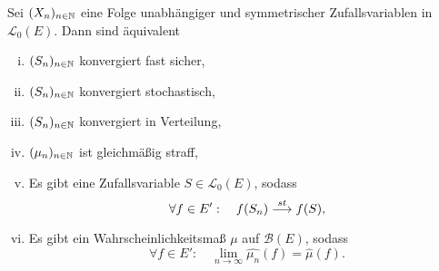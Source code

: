 \begin{theorem}
    Sei $(X_n)_{n \in \mathbb{N}}$ eine Folge unabhängiger und symmetrischer Zufallsvariablen in $\mathcal{L}_0(E)$. Dann sind äquivalent
    \begin{enumerate}[(i)]
        \item $(S_n)_{n \in \mathbb{N}}$ konvergiert fast sicher, 
        \item $(S_n)_{n \in \mathbb{N}}$ konvergiert stochastisch, 
        \item $(S_n)_{n \in \mathbb{N}}$ konvergiert in Verteilung, 
        \item $(\mu_n)_{n \in \mathbb{N}}$ ist gleichmäßig straff, 
        \item Es gibt eine Zufallsvariable $S \in \mathcal{L}_0(E)$, sodass 
        $$
            \forall f \in E': \quad f(S_n) \overset{st}{\longrightarrow} f(S),
        $$
        \item Es gibt ein Wahrscheinlichkeitsmaß $\mu$ auf $\mathcal{B}(E)$, sodass 
        $$
            \forall f \in E': \quad \lim_{n \to \infty}\widehat{\mu_n}(f) = \widehat{\mu}(f). 
        $$
    \end{enumerate}
\end{theorem}

